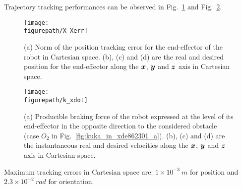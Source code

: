 Trajectory tracking performances can be observed in Fig.~\ref{fig:X_Xerr} and Fig.~\ref{fig:k_xdot}.
\begin{figure}[h]
\centering
{\texttt{[image: \\figurepath/X\_Xerr]}}
\caption{(a) Norm of the position tracking error for the end-effector of the robot in Cartesian space. (b), (c) and (d) are the real and desired position for the end-effector along the $\mbox{\boldmath${x}$}$, $\mbox{\boldmath${y}$}$ and $\mbox{\boldmath${z}$}$ axis in Cartesian space.} 
\label{fig:X_Xerr}
\end{figure}
\begin{figure}[!htbp]
\centering
{\texttt{[image: \\figurepath/k\_xdot]}}
\caption{(a) Producible braking force of the robot expressed at the level of its end-effector in the opposite direction to the considered obstacle (case $O_2$ in Fig.~\ref{fig:kuka_in_xde862301_a}). (b), (c) and (d) are the instantaneous real and desired velocities along the $\mbox{\boldmath${x}$}$, $\mbox{\boldmath${y}$}$ and $\mbox{\boldmath${z}$}$ axis in Cartesian space.} 
\label{fig:k_xdot}
\end{figure}
Maximum tracking errors in Cartesian space are: $1 \times 10^{-3}~m$ for position and $2.3 \times 10^{-2}~rad$ for orientation. 

